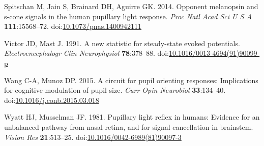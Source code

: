 \documentclass[
]{article}
\newlength{\cslhangindent}
\newlength{\cslentryspacingunit} %
\newenvironment{CSLReferences}[2] %
 {%
  \setlength{\parindent}{0pt}
  \ifodd #1
  \let\oldpar\par
  \def\par{\hangindent=\cslhangindent\oldpar}
  \fi
  \setlength{\parskip}{#2\cslentryspacingunit}
 }%
 {}
\begin{document}
\begin{CSLReferences}{1}{0}
\leavevmode{}%
Spitschan M, Jain S, Brainard DH, Aguirre GK. 2014. Opponent melanopsin and s-cone signals in the human pupillary light response. \emph{Proc Natl Acad Sci U S A} \textbf{111}:15568--72. doi:\href{https://doi.org/10.1073/pnas.1400942111}{10.1073/pnas.1400942111}

\leavevmode{}%
Victor JD, Mast J. 1991. A new statistic for steady-state evoked potentials. \emph{Electroencephalogr Clin Neurophysiol} \textbf{78}:378--88. doi:\href{https://doi.org/10.1016/0013-4694(91)90099-p}{10.1016/0013-4694(91)90099-p}

\leavevmode{}%
Wang C-A, Munoz DP. 2015. A circuit for pupil orienting responses: Implications for cognitive modulation of pupil size. \emph{Curr Opin Neurobiol} \textbf{33}:134--40. doi:\href{https://doi.org/10.1016/j.conb.2015.03.018}{10.1016/j.conb.2015.03.018}

\leavevmode{}%
Wyatt HJ, Musselman JF. 1981. Pupillary light reflex in humans: Evidence for an unbalanced pathway from nasal retina, and for signal cancellation in brainstem. \emph{Vision Res} \textbf{21}:513--25. doi:\href{https://doi.org/10.1016/0042-6989(81)90097-3}{10.1016/0042-6989(81)90097-3}

\end{CSLReferences}
\end{document}
